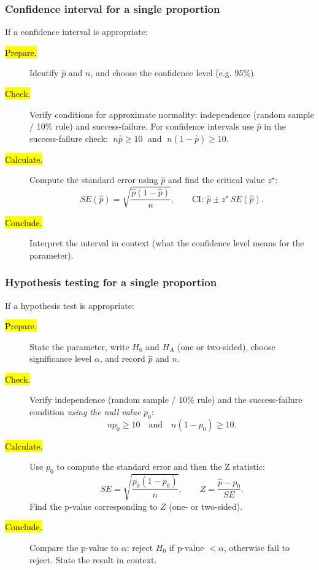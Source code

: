 \documentclass[slidestop,compress,mathserif]{beamer}
\begin{document}
\begin{frame}
\frametitle{Confidence interval for a single proportion}

If a confidence interval is appropriate:

\begin{description}
  \item[\hl{Prepare.}] Identify $\hat{p}$ and $n$, and choose the confidence level (e.g. 95\%).
  \item[\hl{Check.}] Verify conditions for approximate normality: independence (random sample / 10\% rule) and success-failure. For confidence intervals use $\hat{p}$ in the success-failure check: $\;n\hat{p}\ge10\;$ and $\;n(1-\hat{p})\ge10$.
  \item[\hl{Calculate.}] Compute the standard error using $\hat{p}$ and find the critical value $z^\star$:
  \[
    SE(\hat{p})=\sqrt{\dfrac{\hat{p}(1-\hat{p})}{n}}, \qquad
    \text{CI: }\hat{p}\pm z^\star \,SE(\hat{p}).
  \]
  \item[\hl{Conclude.}] Interpret the interval in context (what the confidence level means for the parameter).
\end{description}

\end{frame}


\begin{frame}
\frametitle{Hypothesis testing for a single proportion}

If a hypothesis test is appropriate:

\begin{small}
\begin{description}
  \item[\hl{Prepare.}] State the parameter, write $H_0$ and $H_A$ (one or two-sided), choose significance level $\alpha$, and record $\hat{p}$ and $n$.
  \item[\hl{Check.}] Verify independence (random sample / 10\% rule) and the success-failure condition \emph{using the null value} $p_0$: \[
    np_0 \ge 10 \quad\text{and}\quad n(1-p_0)\ge 10.
  \]
  \item[\hl{Calculate.}] Use $p_0$ to compute the standard error and then the Z statistic:
  \[
    SE = \sqrt{\dfrac{p_0(1-p_0)}{n}}, \qquad
    Z=\dfrac{\hat{p}-p_0}{SE}.
  \]
  Find the p-value corresponding to $Z$ (one- or two-sided).
  \item[\hl{Conclude.}] Compare the p-value to $\alpha$: reject $H_0$ if p-value $<\alpha$, otherwise fail to reject. State the result in context.
\end{description}
\end{small}
\end{frame}
\end{document}
